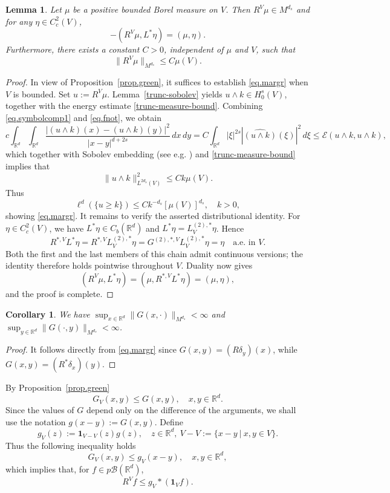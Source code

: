 \documentclass[11pt,a4paper,reqno]{amsart}
\newtheorem{lemma}[theorem]{\bf Lemma}
\newtheorem{corollary}[theorem]{\bf Corollary}
\theoremstyle{definition}
\numberwithin{equation}{section}
\begin{document}
\begin{lemma}
\label{lm.duoper}
Let   $\mu$ be a positive bounded Borel measure  on $V$.
Then  $R^{V}\mu\in M^{d_s}$ and  for any $\eta\in C_c^2(V)$,
\[
-(R^{V}\mu,L^{*}\eta)=(\mu,\eta).
\]
Furthermore, there exists a constant $C>0$, independent of $\mu$ and $V$, such that
\begin{equation}
\label{eq.margr}
\|R^V\mu\|_{M^{d_s}}\le C\mu(V).
\end{equation}
\end{lemma}
\begin{proof}
In view of Proposition~\ref{prop.green}, it suffices to establish \eqref{eq.margr} when \(V\) is bounded. 
Set \(u:=R^V\mu\). 
Lemma~\ref{trunc-sobolev} yields \(u\wedge k\in H_0^s(V)\), together with the energy estimate \eqref{trunc-measure-bound}. 
Combining \eqref{eq.symbolcomp1} and  \eqref{eq.fnot}, we obtain
\[
c\int_{\mathbb{R}^d} \int_{\mathbb{R}^d} \frac{|(u\wedge k)(x)-(u\wedge k)(y)|^2}{|x-y|^{d+2s}} \, dx\,dy
=C\int_{\mathbb{R}^d}|\xi|^{2 s}|\widehat{(u\wedge k)}(\xi)|^2 \,d \xi\leq \mathcal{E}(u\wedge k, u\wedge k),
\]
which together with Sobolev embedding (see e.g. \cite[Theorem 7.6]{Leoni2023}) and \eqref{trunc-measure-bound} implies that 
\[
\|u\wedge k \|^2_{L^{2{d_s}}(V)}\leq C k\mu(V).
\]
Thus 
\[
\ell^d(\{u\ge k\})\leq Ck^{-{d_s}}[\mu(V)]^{d_s},\quad k>0,
\]
showing \eqref{eq.margr}.
It remains to verify the asserted distributional identity. 
For \(\eta\in C_c^2(V)\), we have \(L^*\eta\in C_b(\mathbb R^d)\) and \(L^*\eta=L_V^{(2),*}\eta\). 
Hence 
\[
R^{*,V}L^*\eta = R^{*,V}L_V^{(2),*}\eta = G^{(2),*,V}L_V^{(2),*}\eta = \eta \quad\text{a.e. in }V.
\]
Both the first and the last members of this chain admit continuous versions; the identity therefore holds pointwise throughout 
\(V\). Duality now gives \[ (R^V\mu,L^*\eta) = (\mu,R^{*,V}L^*\eta) = (\mu,\eta), \] and the proof is complete.
\end{proof}

\begin{corollary}
\label{green-weak}
We have $\sup_{x\in \mathbb R^d}\|G(x,\cdot)\|_{M^{{d_s}}}<\infty$ and $\sup_{y\in \mathbb R^d}\|G(\cdot,y)\|_{M^{{d_s}}}<\infty$. 
\end{corollary} 
\begin{proof}
It follows directly from \eqref{eq.margr} since $G(x,y)=(R\delta_y)(x)$, while 
 $G(x,y)=(R^{*}\delta_x)(y)$.
\end{proof}


By Proposition~\ref{prop.green}
\[
G_V(x,y)\leq G(x,y),\quad x,y\in \mathbb{R}^d.
\]
Since the values of $G$ depend only on the difference of the arguments, we shall use the notation $g(x-y):=G(x,y)$. Define
\[
g_V(z):=\mathbf{1}_{V-V}(z)g(z),\quad z\in \mathbb{R}^d,\ V-V:=\{x-y\ |\ x,y\in V\}.
\]
Thus the following inequality holds
\[
G_V(x,y)\leq g_V(x-y),\quad x,y\in \mathbb{R}^d,
\]
which implies that, for $f\in p\mathscr B(\mathbb R^d)$, 
\begin{equation}\label{conv-ineq}
R^Vf\leq g_V\ast (\mathbf1_V f).
\end{equation}
\end{document}

